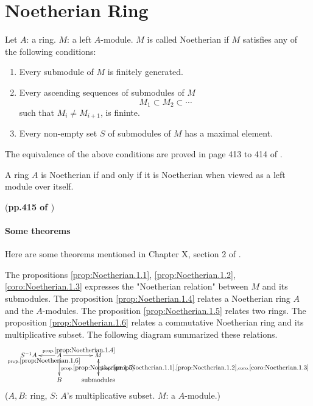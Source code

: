 \documentclass{article}
\begin{document}
\section{Noetherian Ring}
\label{sec:Noetherian}
\begin{defi}
    Let $A$: a ring. $M$: a left $A$-module. $M$ is called Noetherian
    if $M$ satisfies any of the following conditions:
    \begin{enumerate}
        \item Every submodule of $M$ is finitely generated.
        \item Every ascending sequences of submodules of $M$
            \[ M_1 \subset M_2 \subset \cdots \]
            such that $M_i \neq M_{i+1}$, is fininte.
        \item Every non-empty set $S$ of submodules of $M$ has a maximal
            element.
    \end{enumerate}
\end{defi}

The equivalence of the above conditions are proved in page 413 to 414 of 
\cite{lang}.

\begin{defi}
    A ring $A$ is Noetherian if and only if it is Noetherian when
    viewed as a left module over itself.
\end{defi}
(\textbf{pp.415 of \cite{lang}})

\paragraph{Some theorems} 

Here are some theorems mentioned in Chapter X,
section 2 of \cite{lang}.

The propositions \ref{prop:Noetherian.1.1},
\ref{prop:Noetherian.1.2}, \ref{coro:Noetherian.1.3} expresses the
"Noetherian relation" between $M$ and its submodules. The proposition
\ref{prop:Noetherian.1.4} relates a Noetherian ring $A$ and the
$A$-modules. The proposition \ref{prop:Noetherian.1.5} relates two
rings. The proposition \ref{prop:Noetherian.1.6} relates a commutative
Noetherian ring and its multiplicative subset. The following diagram
summarized these relations.
$$ \xymatrix{
S^{-1}A & A
            \ar[d]^{\text{prop.} \ref{prop:Noetherian.1.5}}
            \ar[l]^{\text{prop.} \ref{prop:Noetherian.1.6}}
            \ar[r]^{\text{prop.} \ref{prop:Noetherian.1.4}}
        & M\ar[d]^{\text{prop.}:
            \ref{prop:Noetherian.1.1},
            \ref{prop:Noetherian.1.2},
            \text{coro.} \ref{coro:Noetherian.1.3}} \\
            & B       & \text{submodules}\ar[u]
} $$
($A,B$: ring, $S$: $A$'s multiplicative subset. $M$: a $A$-module.)
\end{document}
